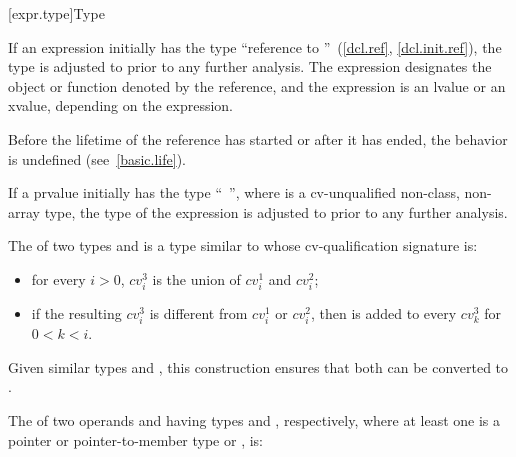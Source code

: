 [expr.type]{Type}

\pnum
{}%
If an expression initially has the type ``reference to
''~(\ref{dcl.ref}, \ref{dcl.init.ref}), the type is adjusted to
 prior to any further analysis. The expression designates the
object or function denoted by the reference, and the expression
is an lvalue or an xvalue, depending on the expression.
\begin{note}
Before the lifetime of the reference has started or after it has ended,
the behavior is undefined (see~\ref{basic.life}).
\end{note}

\pnum
If a prvalue initially has the type ``\cv{}~'', where
 is a cv-unqualified non-class, non-array type, the type of
the expression is adjusted to  prior to any further analysis.

\pnum
The  of two types  and 
is a type 
similar to  whose cv-qualification signature is:
\begin{itemize}
\item
for every $i > 0$, $cv^3_i$ is the union of
$cv^1_i$ and $cv^2_i$;

\item
if the resulting $cv^3_i$ is different from
$cv^1_i$ or $cv^2_i$, then
 is added to every $cv^3_k$ for $0 < k < i$.
\end{itemize}

\begin{note} Given similar types  and , this
construction ensures that
both can be converted to . \end{note}

\pnum
{}%
The  of
two operands  and
 having types  and , respectively, where at least one is a
pointer or pointer-to-member type or
, is:

